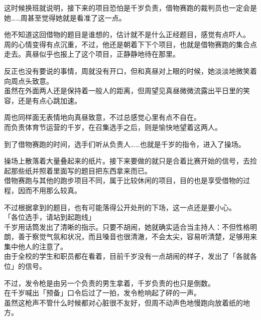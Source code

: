 这时候换班就说明，接下来的项目恐怕是千岁负责，借物赛跑的裁判员也一定会是她……周甚至觉得她就是看准了这一点。

他不知道这回借物的题目是谁想的，估计就不是什么正经题目，感觉有点吓人。\\

周的心情变得有点沉重，不过，他还是朝着下下个项目，也就是借物赛跑的集合点走去。真昼似乎也报上了这个项目，正静静地待在那里。

反正也没有要说的事情，周就没有开口，但和真昼对上眼的时候，她淡淡地微笑着向周点头致意。\\

虽然在外面两人还是保持着一般人的距离，但周望见真昼微微流露出平日里的笑容，还是有点心跳加速。

周也同样面无表情地向真昼致意，不过总感觉心里有点不自在。\\

而负责体育节运营的千岁，在召集选手之后，则是愉快地望着这两人。\\

\vspace{2\baselineskip}

到了借物赛跑的时间，选手们听从负责人……也就是千岁的指令，进入了操场。

操场上散落着大量叠起来的纸片。接下来要做的就只是合着比赛开始的信号，去捡起那些纸并照着里面写的题目把东西拿来而已。\\

借物赛跑与其他的跑步项目不同，属于比较休闲的项目，目的也是享受借物的过程，因而不用那么较真。

不过根据拿到的题目，也有可能落得公开处刑的下场，这一点还是要小心。\\

「各位选手，请站到起跑线」\\

千岁用话筒发出了清晰的指示。只要不胡闹，她就确实适合当主持人：不但性格明朗，善于察觉气氛和状况，而且嗓音也很清澈，不会太尖，容易听清楚，足够用来集中他人的注意了。\\

由于全校的学生和职员都在看着，目前千岁没有一点胡闹的样子，发出了「各就各位」的信号。

不过，发令枪是由另一个负责的男生拿着，千岁负责的也只是倒数。\\

在千岁喊出「预备」口令后过了一拍，发令枪响起了砰的一声。\\

虽然这枪声不管什么时候都对心脏很不友好，但周不动声色地慢跑向放着纸的地方。

